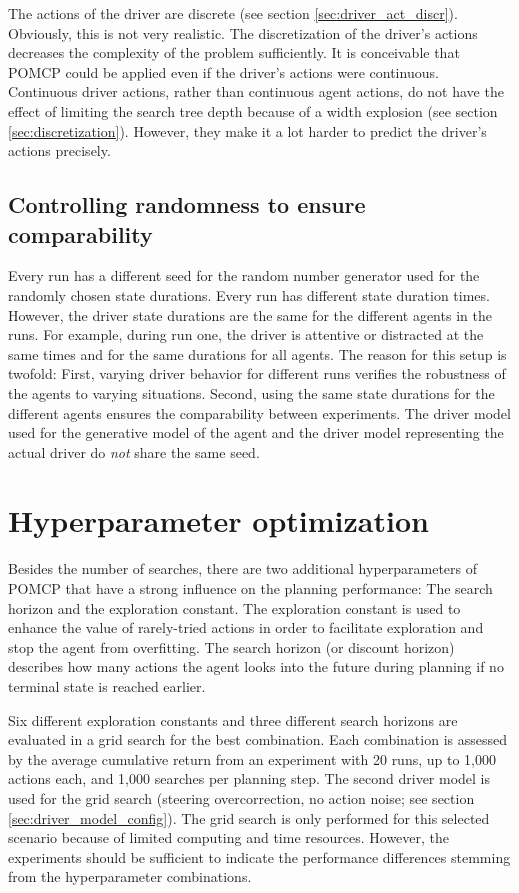 The actions of the driver are discrete (see section \ref{sec:driver_act_discr}). Obviously, this is not very realistic. The discretization of the driver's actions decreases the complexity of the problem sufficiently. It is conceivable that POMCP could be applied even if the driver's actions were continuous. Continuous driver actions, rather than continuous agent actions, do not have the effect of limiting the search tree depth because of a width explosion (see section \ref{sec:discretization}). However, they make it a lot harder to predict the driver's actions precisely.

\subsection{Controlling randomness to ensure comparability}

Every run has a different seed for the random number generator used for the randomly chosen state durations. Every run has different state duration times. However, the driver state durations are the same for the different agents in the runs. For example, during run one, the driver is attentive or distracted at the same times and for the same durations for all agents. The reason for this setup is twofold: First, varying driver behavior for different runs verifies the robustness of the agents to varying situations. Second, using the same state durations for the different agents ensures the comparability between experiments. The driver model used for the generative model of the agent and the driver model representing the actual driver do \emph{not} share the same seed.

\section{Hyperparameter optimization}
\label{sec:exp_hyperparams}

Besides the number of searches, there are two additional hyperparameters of POMCP that have a strong influence on the planning performance: The search horizon and the exploration constant. The exploration constant is used to enhance the value of rarely-tried actions in order to facilitate exploration and stop the agent from overfitting. The search horizon (or discount horizon) describes how many actions the agent looks into the future during planning if no terminal state is reached earlier.

Six different exploration constants and three different search horizons are evaluated in a grid search for the best combination. Each combination is assessed by the average cumulative return from an experiment with 20 runs, up to 1,000 actions each, and 1,000 searches per planning step. The second driver model is used for the grid search (steering overcorrection, no action noise; see section \ref{sec:driver_model_config}). The grid search is only performed for this selected scenario because of limited computing and time resources. However, the experiments should be sufficient to indicate the performance differences stemming from the hyperparameter combinations.

